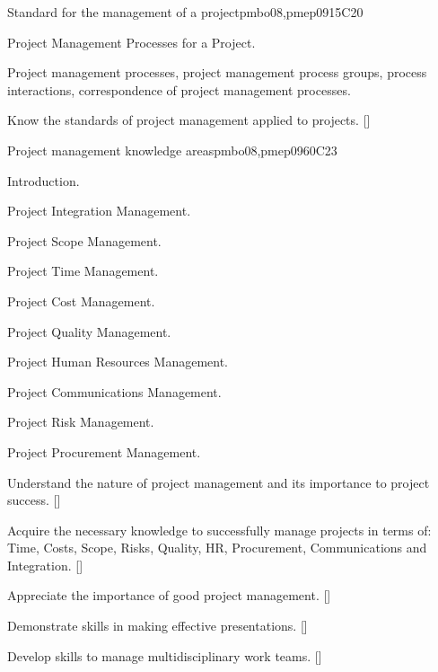 \begin{syllabus}
\begin{unit}{Standard for the management of a project}{}{pmbo08,pmep09}{15}{C20}
\begin{topics}
      \item Project Management Processes for a Project.
      \item Project management processes, project management process groups, process interactions, correspondence of project management processes.
   \end{topics}

   \begin{learningoutcomes}
      \item Know the standards of project management applied to projects. [\Usage]
   \end{learningoutcomes}
\end{unit}

\begin{unit}{Project management knowledge areas}{}{pmbo08,pmep09}{60}{C23}
\begin{topics}
      \item Introduction.
      \item Project Integration Management.
      \item Project Scope Management.
      \item Project Time Management.
      \item Project Cost Management.
      \item Project Quality Management.
      \item Project Human Resources Management.
      \item Project Communications Management.
      \item Project Risk Management.
      \item Project Procurement Management.
   \end{topics}

   \begin{learningoutcomes}
      \item Understand the nature of project management and its importance to project success. [\Assessment]
      \item Acquire the necessary knowledge to successfully manage projects in terms of: Time, Costs, Scope, Risks, Quality, HR, Procurement, Communications and Integration. [\Usage]
      \item Appreciate the importance of good project management. [\Assessment]
      \item Demonstrate skills in making effective presentations. [\Usage]
      \item Develop skills to manage multidisciplinary work teams. [\Usage]
   \end{learningoutcomes}
\end{unit}


\begin{coursebibliography}
\end{coursebibliography}

\end{syllabus}
